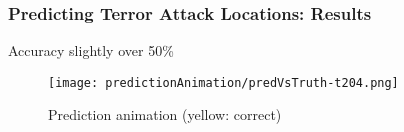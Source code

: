 \begin{frame}
\frametitle{Predicting Terror Attack Locations: Results}
Accuracy slightly over 50\%

\begin{figure}[H]
\begin{center}
\texttt{[image: predictionAnimation/predVsTruth-t204.png]}
\caption{Prediction animation (yellow: correct)}
\label{fig:}
\end{center}
\end{figure}
\end{frame}
